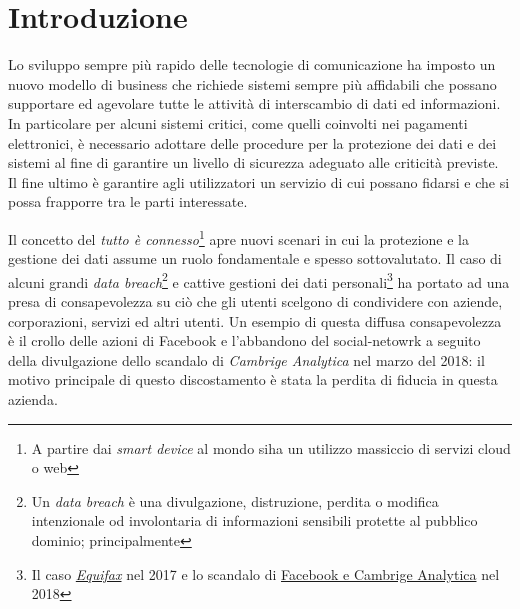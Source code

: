 \chapter{Introduzione}

Lo sviluppo sempre più rapido delle tecnologie di comunicazione ha imposto un nuovo modello di business che richiede sistemi sempre più affidabili che possano supportare ed agevolare tutte le attività di interscambio di dati ed informazioni. In particolare per alcuni sistemi critici, come quelli coinvolti nei pagamenti elettronici, è necessario adottare delle procedure per la protezione dei dati e dei sistemi al fine di garantire un livello di sicurezza adeguato alle criticità previste.\newline
Il fine ultimo è garantire agli utilizzatori un servizio di cui possano fidarsi e che si possa frapporre tra le parti interessate.\newline

Il concetto del \textit{tutto è connesso}\footnote{A partire dai \textit{smart device} al mondo  siha un utilizzo massiccio di servizi cloud o web} apre nuovi scenari in cui la protezione e la gestione dei dati assume un ruolo fondamentale e spesso sottovalutato. Il caso di alcuni grandi \textit{data breach}\footnote{Un \textit{data breach} è una divulgazione, distruzione, perdita o modifica intenzionale od involontaria di informazioni sensibili protette al pubblico dominio; principalmente } e cattive gestioni dei dati personali\footnote{Il caso \href{https://www.nytimes.com/2017/09/07/business/equifax-cyberattack.html}{\textit{Equifax}} nel 2017 e lo scandalo di \href{https://www.washingtonpost.com/business/understanding-the-facebook-cambridge-analytica-story-quicktake/2018/04/09/0f18d91c-3c1c-11e8-955b-7d2e19b79966_story.html}{Facebook e Cambrige Analytica} nel 2018} ha portato ad una presa di consapevolezza su ciò che gli utenti scelgono di condividere con aziende, corporazioni, servizi ed altri utenti.\newline
Un esempio di questa diffusa consapevolezza è il crollo delle azioni di Facebook e l'abbandono del social-netowrk a seguito della divulgazione dello scandalo di \textit{Cambrige Analytica} nel marzo del 2018: il motivo principale di questo discostamento è stata la perdita di fiducia in questa azienda.\newline

